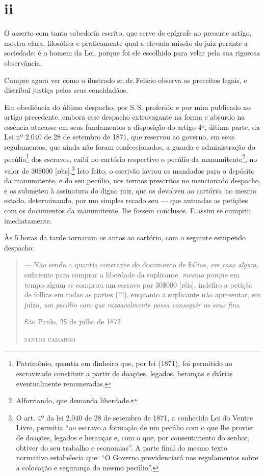 \section{ii}

O asserto com tanta sabedoria escrito, que serve de epígrafe ao presente
artigo, mostra clara, filosófica e praticamente qual a elevada missão do
juiz perante a sociedade: é o homem da Lei, porque foi ele escolhido
para velar pela sua rigorosa observância.

Cumpre agora ver como o ilustrado sr.\,dr.\,Felicio observa os preceitos
legais, e distribui justiça pelos seus concidadãos.

Em obediência do último despacho, por S.\,S. proferido e por mim
publicado no artigo precedente, embora esse despacho extravagante na
forma e absurdo na essência atacasse em seus fundamentos a disposição do
artigo 4º, última parte, da Lei nº 2.040 de 28 de setembro de 1871, que 
reservou ao governo, em seus regulamentos, que ainda não foram
confeccionados, a guarda e administração do pecúlio\footnote{
  Patrimônio, quantia em dinheiro que, por lei (1871), foi permitido ao
  escravizado constituir a partir de doações, legados, heranças e
  diárias eventualmente remuneradas.} dos escravos, exibi no cartório
respectivo o pecúlio da manumitente\footnote{ Alforriando, que demanda
  liberdade.}, no valor de 30\$000 {[}réis{]}.\footnote{ O art. 4º da
  lei 2.040 de 28 de setembro de 1871, a conhecida Lei do Ventre Livre, permitia ``ao
  escravo a formação de um pecúlio com o que lhe provier de doações,
  legados e heranças e, com o que, por consentimento do senhor, obtiver
  do seu trabalho e economias''. A parte final do mesmo texto normativo
  estabelecia que: ``O Governo providenciará nos regulamentos sobre a
  colocação e segurança do mesmo pecúlio''.} Isto feito, o escrivão
lavrou os mandados para o depósito da manumitente, e do seu pecúlio, nos
termos prescritos no mencionado despacho, e os submeteu à assinatura do
digno juiz, que os devolveu ao cartório, no mesmo estado, determinando,
por um simples recado seu --- que autuadas as petições com os documentos
da manumitente, lhe fossem conclusos. E assim se cumpriu
imediatamente.

Às 5 horas da tarde tornaram os autos ao cartório, com o seguinte
estupendo despacho:

\begin{quote}
--- Não sendo a quantia constante do documento de folhas, \emph{em caso
algum}, suficiente para comprar a liberdade da suplicante, \emph{mesmo}
porque em tempo algum se comprou um escravo por 30\$000 {[}réis{]},
indefiro a petição de folhas em todas as partes (!!!), enquanto a
suplicante não apresentar, em juízo, \emph{um pecúlio com que
razoavelmente possa conseguir os seus fins}.

\begin{flushright}
São Paulo, 25 de julho de 1872

\textsc{santos camargo}
\end{flushright}
\end{quote}

